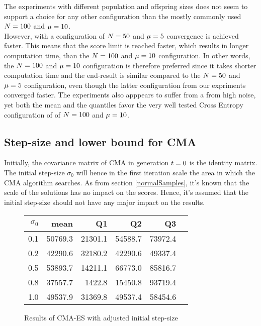 The experiments with different population and offspring sizes
does not seem to support a choice for any other configuration 
than the mostly commonly used 
$N = 100$ and $\mu = 10$. \\
However, with a configuration of $N = 50$ and $\mu = 5$ convergence
is achieved faster. This means that the score limit is reached faster, which
results in longer computation time, than the $N = 100$ and $\mu = 10$
configuration. In other words, the $N = 100$ and $\mu = 10$ configuration 
is therefore preferred since it takes shorter computation time and the end-result is similar compared
to the $N = 50$ and $\mu = 5$ configuration, even though the latter 
configuration from our expriments converged faster. The experiments also apppears
to suffer from a from high noise, yet both the mean and the quantiles favor the 
very well tested Cross Entropy configuration of of $N = 100$ and $\mu = 10$.


\subsection{Step-size and lower bound for CMA}
Initially, the covariance matrix of CMA in generation $t = 0$
is the identity matrix. The initial step-size $\sigma_0$ will hence in 
the first iteration scale the area in which the CMA algorithm searches.
As from section \ref{normalSamples}, it's known that the scale of the 
solutions has no impact on the scores. Hence, it's assumed that the initial 
step-size should not have any major impact on the results.

\begin{figure}[H]
\centering
\begin{tabular}{r | r r r r r}
$\sigma_0$ & mean & Q1 & Q2 & Q3\\
\hline
0.1 & 50769.3 & 21301.1 & 54588.7 & 73972.4\\
0.2 & 42290.6 & 32180.2 & 42290.6 & 49337.4\\
0.5 & 53893.7 & 14211.1 & 66773.0 & 85816.7\\
0.8 & 37557.7 & 1422.8  & 15450.8 & 93719.4\\
1.0 & 49537.9 & 31369.8 & 49537.4 & 58454.6
\end{tabular}
\caption{Results of CMA-ES with adjusted initial step-size \label{CEConfigTest}}
\end{figure}

